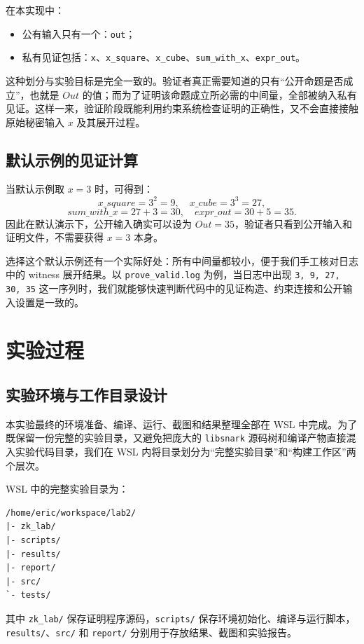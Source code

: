 \documentclass[UTF8,a4paper,10pt]{ctexart}
\begin{document}
在本实现中：
\begin{itemize}
    \item 公有输入只有一个：\texttt{out}；
    \item 私有见证包括：\texttt{x}、\texttt{x\_square}、\texttt{x\_cube}、\texttt{sum\_with\_x}、\texttt{expr\_out}。
\end{itemize}

这种划分与实验目标是完全一致的。验证者真正需要知道的只有“公开命题是否成立”，也就是 $Out$ 的值；而为了证明该命题成立所必需的中间量，全部被纳入私有见证。这样一来，验证阶段既能利用约束系统检查证明的正确性，又不会直接接触原始秘密输入 $x$ 及其展开过程。

\subsection{默认示例的见证计算}
当默认示例取 $x=3$ 时，可得到：
\[
x\_square = 3^2 = 9,
\quad
x\_cube = 3^3 = 27,
\]
\[
sum\_with\_x = 27 + 3 = 30,
\quad
expr\_out = 30 + 5 = 35.
\]
因此在默认演示下，公开输入确实可以设为 $Out=35$，验证者只看到公开输入和证明文件，不需要获得 $x=3$ 本身。

选择这个默认示例还有一个实际好处：所有中间量都较小，便于我们手工核对日志中的 witness 展开结果。以 \texttt{prove\_valid.log} 为例，当日志中出现 \texttt{3, 9, 27, 30, 35} 这一序列时，我们就能够快速判断代码中的见证构造、约束连接和公开输入设置是一致的。

\section{实验过程}

\subsection{实验环境与工作目录设计}
本实验最终的环境准备、编译、运行、截图和结果整理全部在 WSL 中完成。为了既保留一份完整的实验目录，又避免把庞大的 \texttt{libsnark} 源码树和编译产物直接混入实验代码目录，我们在 WSL 内将目录划分为“完整实验目录”和“构建工作区”两个层次。

WSL 中的完整实验目录为：
\begin{lstlisting}[title=WSL 侧完整实验目录,frame=trbl]
/home/eric/workspace/lab2/
|- zk_lab/
|- scripts/
|- results/
|- report/
|- src/
`- tests/
\end{lstlisting}

其中 \texttt{zk\_lab/} 保存证明程序源码，\texttt{scripts/} 保存环境初始化、编译与运行脚本，\texttt{results/}、\texttt{src/} 和 \texttt{report/} 分别用于存放结果、截图和实验报告。
\end{document}
